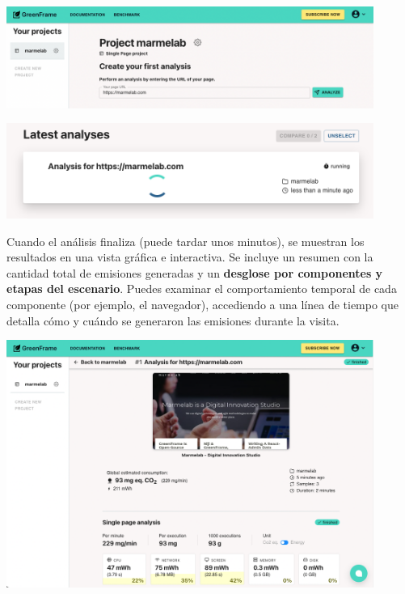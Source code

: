 \documentclass[12pt,a4paper]{report}
\begin{document}
\begin{center}
  \includegraphics[width=0.9\textwidth]{imagenes/Greenframe_3.png}
\end{center}

\begin{center}
  \includegraphics[width=0.9\textwidth]{imagenes/Greenframe_4.png}
\end{center}

Cuando el análisis finaliza (puede tardar unos minutos), se muestran los
resultados en una vista gráfica e interactiva. Se incluye un resumen con la
cantidad total de emisiones generadas y un \textbf{desglose por componentes y
  etapas del escenario}. Puedes examinar el comportamiento temporal de cada
componente (por ejemplo, el navegador), accediendo a una línea de tiempo que
detalla cómo y cuándo se generaron las emisiones durante la visita.

\begin{center}
  \includegraphics[width=0.9\textwidth]{imagenes/Greenframe_5.png}
\end{center}
\end{document}
